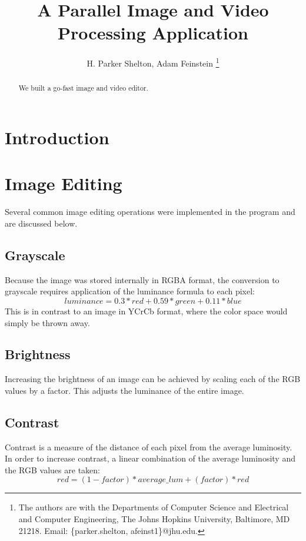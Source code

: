 \documentclass[10pt,twocolumn,twoside]{IEEEtran}
\begin{document}
\title{A Parallel Image and Video Processing Application}
\author{H. Parker Shelton, Adam Feinstein
\thanks{The authors are with the Departments of Computer Science and Electrical and Computer Engineering, The Johns Hopkins University, Baltimore, MD 21218.
Email: \{parker.shelton, afeinst1\}@jhu.edu.}}

\maketitle

\vskip -20pt

\begin{abstract}
We built a go-fast image and video editor.
\end{abstract}

\section{Introduction}

\section{Image Editing}
Several common image editing operations were implemented in the program and are discussed below.

\subsection{Grayscale}
Because the image was stored internally in RGBA format, the conversion to grayscale requires application of the luminance formula to each pixel: \begin{equation*}luminance = 0.3*red + 0.59*green + 0.11*blue \end{equation*}This is in contrast to an image in YCrCb format, where the color space would simply be thrown away.

\subsection{Brightness}
Increasing the brightness of an image can be achieved by scaling each of the RGB values by a factor. This adjusts the luminance of the entire image.

\subsection{Contrast}
Contrast is a measure of the distance of each pixel from the average luminosity. In order to increase contrast,  a linear combination of the average luminosity and the RGB values are taken:
\begin{equation*} red = (1 - factor)*average\_lum + (factor)*red \end{equation*}
\end{document}
